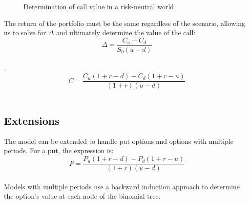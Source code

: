 \documentclass[a4paper,10pt]{article}
\begin{document}
        \begin{figure}[ht]
        \centering
        \caption{Determination of call value in a risk-neutral world}
        \end{figure}
        
        \noindent The return of the portfolio must be the same regardless of the scenario, allowing us to solve for \( \Delta \) and ultimately determine the value of the call:
        \\\[ 
        \Delta = \frac{C_u - C_d}{S_0 (u - d)} 
        \]\\.
        \\\[ 
        C = \frac{C_u (1 + r - d) - C_d (1 + r - u)}{(1 + r)(u - d)} 
        \]\\
        
    \subsection*{Extensions}
    
        \noindent The model can be extended to handle put options and options with multiple periods. For a put, the expression is:
        \\\[ P = \frac{P_u (1 + r - d) - P_d (1 + r - u)}{(1 + r)(u - d)} \]\\
        
        \noindent Models with multiple periods use a backward induction approach to determine the option's value at each node of the binomial tree.
        
\end{document}

